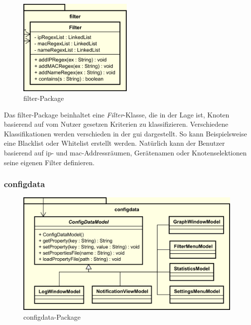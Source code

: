     \begin{figure}[H]
      \centering
      \includegraphics[width=0.5\textwidth]{../diagramimages/filter.png}
      \caption{filter-Package}
    \end{figure}

    \medskip
    Das filter-Package beinhaltet eine \textit{Filter}-Klasse, die in der Lage ist,
    Knoten basierend auf vom Nutzer gesetzen Kriterien zu klassifizieren. Verschiedene
    Klassifikationen werden verschieden in der \gls{gui} dargestellt. So kann
    Beispielsweise eine Blacklist oder Whitelist erstellt werden.
    Natürlich kann der Benutzer basierend auf \gls{ip}- und \gls{mac}-Addressräumen,
    Gerätenamen oder Knotenselektionen seine eigenen Filter definieren.

    \subsubsection{configdata}
    \label{subsubsec:configdata}

    \begin{figure}[H]
      \centering
      \includegraphics[width=\textwidth]{../diagramimages/configdata.png}
      \caption{configdata-Package}
    \end{figure}

